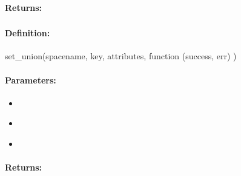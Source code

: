 \paragraph{Returns:}


\pagebreak
\subsubsection{}
\label{api:nodejs:set_union}


\paragraph{Definition:}
\begin{javascriptcode}
set_union(spacename, key, attributes, function (success, err) {})
\end{javascriptcode}
\paragraph{Parameters:}
\begin{itemize}[noitemsep]
\item {}\\

\item {}\\

\item {}\\

\end{itemize}

\paragraph{Returns:}


\pagebreak
\subsubsection{}
\label{api:nodejs:cond_set_union}


